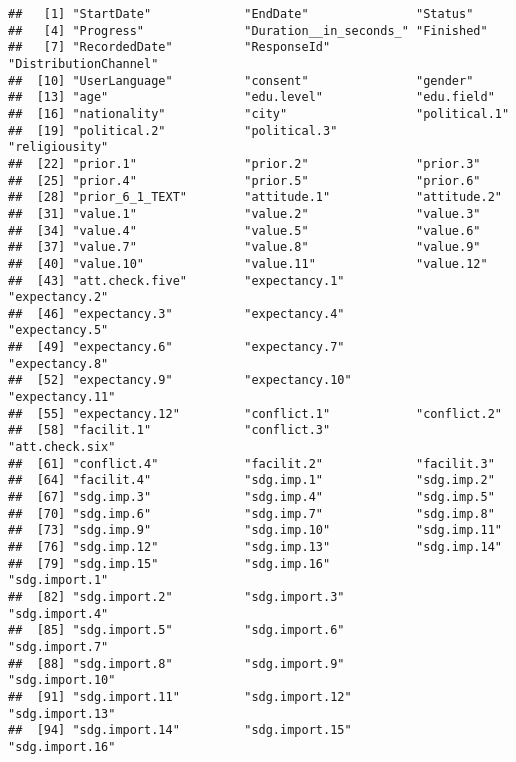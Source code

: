 \documentclass[
]{article}
\begin{document}
\begin{verbatim}
##   [1] "StartDate"             "EndDate"               "Status"               
##   [4] "Progress"              "Duration__in_seconds_" "Finished"             
##   [7] "RecordedDate"          "ResponseId"            "DistributionChannel"  
##  [10] "UserLanguage"          "consent"               "gender"               
##  [13] "age"                   "edu.level"             "edu.field"            
##  [16] "nationality"           "city"                  "political.1"          
##  [19] "political.2"           "political.3"           "religiousity"         
##  [22] "prior.1"               "prior.2"               "prior.3"              
##  [25] "prior.4"               "prior.5"               "prior.6"              
##  [28] "prior_6_1_TEXT"        "attitude.1"            "attitude.2"           
##  [31] "value.1"               "value.2"               "value.3"              
##  [34] "value.4"               "value.5"               "value.6"              
##  [37] "value.7"               "value.8"               "value.9"              
##  [40] "value.10"              "value.11"              "value.12"             
##  [43] "att.check.five"        "expectancy.1"          "expectancy.2"         
##  [46] "expectancy.3"          "expectancy.4"          "expectancy.5"         
##  [49] "expectancy.6"          "expectancy.7"          "expectancy.8"         
##  [52] "expectancy.9"          "expectancy.10"         "expectancy.11"        
##  [55] "expectancy.12"         "conflict.1"            "conflict.2"           
##  [58] "facilit.1"             "conflict.3"            "att.check.six"        
##  [61] "conflict.4"            "facilit.2"             "facilit.3"            
##  [64] "facilit.4"             "sdg.imp.1"             "sdg.imp.2"            
##  [67] "sdg.imp.3"             "sdg.imp.4"             "sdg.imp.5"            
##  [70] "sdg.imp.6"             "sdg.imp.7"             "sdg.imp.8"            
##  [73] "sdg.imp.9"             "sdg.imp.10"            "sdg.imp.11"           
##  [76] "sdg.imp.12"            "sdg.imp.13"            "sdg.imp.14"           
##  [79] "sdg.imp.15"            "sdg.imp.16"            "sdg.import.1"         
##  [82] "sdg.import.2"          "sdg.import.3"          "sdg.import.4"         
##  [85] "sdg.import.5"          "sdg.import.6"          "sdg.import.7"         
##  [88] "sdg.import.8"          "sdg.import.9"          "sdg.import.10"        
##  [91] "sdg.import.11"         "sdg.import.12"         "sdg.import.13"        
##  [94] "sdg.import.14"         "sdg.import.15"         "sdg.import.16"        

\end{verbatim}
\end{document}
